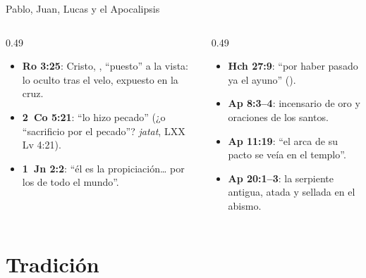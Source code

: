 \begin{frame}{Pablo, Juan, Lucas y el Apocalipsis}
\scriptsize
\begin{columns}[t,onlytextwidth]
\begin{column}{0.49\textwidth}
\begin{itemize}
\item \textbf{Ro 3:25}: Cristo, , ``puesto'' a la vista: lo oculto tras el velo, expuesto en la cruz.
\item \textbf{2~Co 5:21}: ``lo hizo pecado'' (¿o ``sacrificio por el pecado''? \emph{jatat}, LXX Lv 4:21).
\item \textbf{1~Jn 2:2}: ``él es la propiciación\ldots{} por los de todo el mundo''.
\end{itemize}
\end{column}
\begin{column}{0.49\textwidth}
\begin{itemize}
\item \textbf{Hch 27:9}: ``por haber pasado ya el ayuno'' ().
\item \textbf{Ap 8:3--4}: incensario de oro y oraciones de los santos.
\item \textbf{Ap 11:19}: ``el arca de su pacto se veía en el templo''.
\item \textbf{Ap 20:1--3}: la serpiente antigua, atada y sellada en el abismo.
\end{itemize}
\end{column}
\end{columns}\par\medskip
{}
\end{frame}

\section{Tradición}

